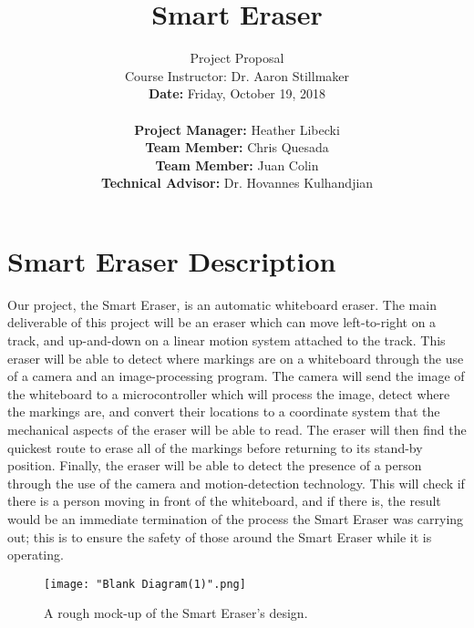 \documentclass[10pt,onecolumn,draftclsnofoot]{IEEEtran} 					%
\title{\vspace{2in}Smart Eraser}	%
\author{Project Proposal \\ 			%
	Course Instructor: Dr. Aaron Stillmaker \\ 				%
	\vspace{12pt} 								%
	\textbf{Date:} Friday, October 19, 2018  \\ 
	\vspace{2in}								%
	\vspace{6pt}
\begin{flushleft}
	\textbf{Project Manager:} Heather Libecki			%
	\vspace{12pt}
	\underline{\hspace{3.77in}}\\					%
	\textbf{Team Member:} Chris Quesada
	\vspace{12pt}
	\underline{\hspace{4in}}\\
	\textbf{Team Member:} Juan Colin
	\vspace{12pt}
	\underline{\hspace{4.25in}}\\
	\textbf{Technical Advisor:} Dr. Hovannes Kulhandjian
	\underline{\hspace{3.05in}} \\
	\end{flushleft}
	\vspace{12in}}								%
\begin{document}
	\thispagestyle{empty}						%
	
	\maketitle									%
	
	
	\section{Smart Eraser Description}
	\setlength{\parindent}{5ex}
	Our project, the Smart Eraser, is an automatic whiteboard eraser. The main deliverable of this project will be an eraser which can move left-to-right on a track, and up-and-down on a linear motion system attached to the track. This eraser will be able to detect where markings are on a whiteboard through the use of a camera and an image-processing program. The camera will send the image of the whiteboard to a microcontroller which will process the image, detect where the markings are, and convert their locations to a coordinate system that the mechanical aspects of the eraser will be able to read. The eraser will then find the quickest route to erase all of the markings before returning to its stand-by position. Finally, the eraser will be able to detect the presence of a person through the use of the camera and motion-detection technology. This will check if there is a person moving in front of the whiteboard, and if there is, the result would be an immediate termination of the process the Smart Eraser was carrying out; this is to ensure the safety of those around the Smart Eraser while it is operating. 

	\begin{figure}[h!]
	\centering
	{\texttt{[image: "Blank Diagram(1)".png]}}
	\caption{A rough mock-up of the Smart Eraser's design.}
	\label{fig:look}
    \end{figure}
\end{document}
